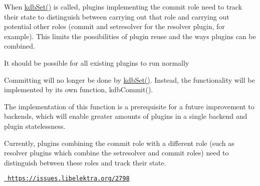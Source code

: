 When {\ttfamily \mbox{\hyperlink{group__kdb_ga11436b058408f83d303ca5e996832bcf}{kdb\+Set()}}} is called, plugins implementing the commit role need to track their state to distinguish between carrying out that role and carrying out potential other roles (commit and setresolver for the resolver plugin, for example). This limits the possibilities of plugin reuse and the ways plugins can be combined.


\begin{DoxyItemize}
\item It should be possible for all existing plugins to run normally
\end{DoxyItemize}

Committing will no longer be done by {\ttfamily \mbox{\hyperlink{group__kdb_ga11436b058408f83d303ca5e996832bcf}{kdb\+Set()}}}. Instead, the functionality will be implemented by its own function, {\ttfamily kdb\+Commit()}.

The implementation of this function is a prerequisite for a future improvement to backends, which will enable greater amounts of plugins in a single backend and plugin statelessness.

Currently, plugins combining the {\ttfamily commit} role with a different role (such as resolver plugins which combine the {\ttfamily setresolver} and {\ttfamily commit} roles) need to distinguish between these roles and track their state.

\href{https://issues.libelektra.org/2798}{\texttt{ https\+://issues.\+libelektra.\+org/2798}} 